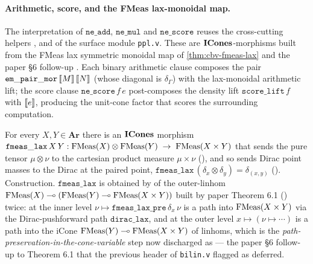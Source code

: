 \paragraph{Arithmetic, score, and the FMeas lax-monoidal map.}
The interpretation of $\mathtt{ne\_add}$, $\mathtt{ne\_mul}$ and
$\mathtt{ne\_score}$ reuses the cross-cutting helpers
,
 and
 of the surface module
\texttt{ppl.v}. These are $\mathbf{ICones}$-morphisms built from the FMeas lax
symmetric monoidal map of \autoref{thm:cbv-fmeas-lax} and the paper
\S6 follow-up
. Each binary
arithmetic clause composes the pair
$\mathtt{em\_pair\_mor}\,[\![ M ]\!]\,[\![ N ]\!]$ (whose diagonal is
$\delta_\Gamma$) with the lax-monoidal arithmetic lift; the score
clause $\mathtt{ne\_score}\,f\,e$ post-composes the density lift
$\mathtt{score\_lift}\,f$ with $[\![ e ]\!]$, producing the unit-cone
factor that scores the surrounding computation.

\begin{theorem}%
\label{thm:cbv-fmeas-lax}
\rocqok
{}\rocqok
{}\rocqok
{}\rocqok
{}
For every $X, Y \in \mathbf{Ar}$ there is an $\mathbf{ICones}$ morphism
$\mathtt{fmeas\_lax}\,X\,Y :
   \mathrm{FMeas}(X) \otimes \mathrm{FMeas}(Y) \;\to\; \mathrm{FMeas}(X \times Y)$
that sends the pure tensor $\mu \otimes \nu$ to the cartesian
product measure $\mu \times \nu$ (),
and so sends Dirac point masses to the Dirac at the paired point,
$\mathtt{fmeas\_lax}\,(\delta_x \otimes \delta_y) = \delta_{(x,y)}$
().
Construction. $\mathtt{fmeas\_lax}$ is obtained by
 of the outer-linhom
$\mathrm{FMeas}(X) \multimap (\mathrm{FMeas}(Y) \multimap \mathrm{FMeas}(X \times Y))$
built by paper Theorem 6.1
() twice: at the inner level
$\nu \mapsto \mathtt{fmeas\_lax\_pre}\,\delta_x\,\nu$ is a path
into $\mathrm{FMeas}(X \times Y)$ via the Dirac-pushforward path
$\mathtt{dirac\_lax}$, and at the outer level $x \mapsto (\nu \mapsto \cdots)$
is a path into the iCone $\mathrm{FMeas}(Y) \multimap \mathrm{FMeas}(X \times Y)$
of linhoms, which is the
\emph{path-preservation-in-the-cone-variable} step now discharged
as  ---
the paper \S6 follow-up to Theorem 6.1 that the previous header of
\texttt{bilin.v} flagged as deferred.
\end{theorem}


